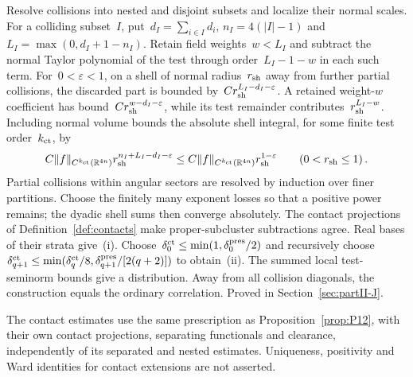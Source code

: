 Resolve collisions into nested and disjoint subsets and localize their normal scales. For a colliding subset~$I$, put~$d_I=\sum_{i\in I}d_i$, $n_I=4(|I|-1)$ and~$L_I=\max(0,d_I+1-n_I)$. Retain field weights~$w<L_I$ and subtract the normal Taylor polynomial of the test through order~$L_I-1-w$ in each such term. For~$0<\varepsilon<1$, on a shell of normal radius~$r_{\rm sh}$ away from further partial collisions, the discarded part is bounded by~$Cr_{\rm sh}^{L_I-d_I-\varepsilon}$. A retained weight-$w$ coefficient has bound~$Cr_{\rm sh}^{w-d_I-\varepsilon}$, while its test remainder contributes~$r_{\rm sh}^{L_I-w}$. Including normal volume bounds the absolute shell integral, for some finite test order~$k_{\rm ct}$, by
\begin{equation}\label{eq:P13-shell}
C\|f\|_{C^{k_{\rm ct}}(\mathbb{R}^{4n})}r_{\rm sh}^{n_I+L_I-d_I-\varepsilon}\le C\|f\|_{C^{k_{\rm ct}}(\mathbb{R}^{4n})}r_{\rm sh}^{1-\varepsilon}\qquad(0<r_{\rm sh}\le1)\,.
\end{equation}
Partial collisions within angular sectors are resolved by induction over finer partitions. Choose the finitely many exponent losses so that a positive power remains; the dyadic shell sums then converge absolutely. The contact projections of Definition~\ref{def:contacts} make proper-subcluster subtractions agree. Real bases of their strata give~\textup{(i)}. Choose~$\delta_0^{\rm ct}\le\min(1,\delta_0^{\rm pres}/2)$ and recursively choose~$\delta_{q+1}^{\rm ct}\le\min(\delta_q^{\rm ct}/8,\delta_{q+1}^{\rm pres}/[2(q+2)])$ to obtain~\textup{(ii)}. The summed local test-seminorm bounds give a distribution. Away from all collision diagonals, the construction equals the ordinary correlation. Proved in Section~\ref{sec:partII-J}.

\begin{remark}
The contact estimates use the same prescription as Proposition~\ref{prop:P12}, with their own contact projections, separating functionals and clearance, independently of its separated and nested estimates. Uniqueness, positivity and Ward identities for contact extensions are not asserted.
\end{remark}

